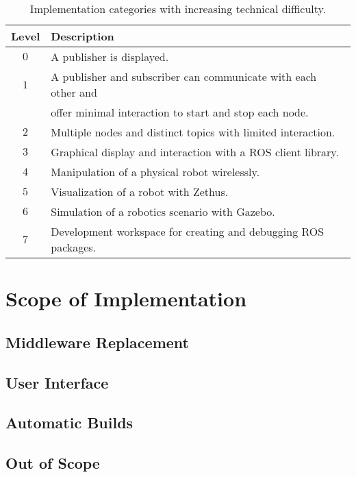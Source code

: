         \begin{table}[htbp]
            \color{textColor}
            \centering	
            \caption{Implementation categories with increasing technical difficulty.}
                \begin{tabular}{cl}
                    \toprule
                    \textbf{Level} & \textbf{Description} \\
                    \midrule
                    $0$ & A publisher is displayed. \\ [0.3em]
                    $1$ & A publisher and subscriber can communicate with each other and \\
                        & offer minimal interaction to start and stop each node. \\[0.3em]
                    $2$ & Multiple nodes and distinct topics with limited interaction. \\[0.3em]
                    $3$ & Graphical display and interaction with a ROS client library. \\[0.3em]
                    $4$ & Manipulation of a physical robot wirelessly. \\[0.3em]
                    $5$ & Visualization of a robot with Zethus. \\[0.3em]
                    $6$ & Simulation of a robotics scenario with Gazebo. \\[0.3em]
                    $7$ & Development workspace for creating and debugging ROS packages. \\
                \bottomrule
            \end{tabular}\label{tab:techlevels}
        \end{table}

\section{Scope of Implementation}

    \subsection{Middleware Replacement}


    \subsection{User Interface}


    \subsection{Automatic Builds}
        


    \subsection{Out of Scope}
        

